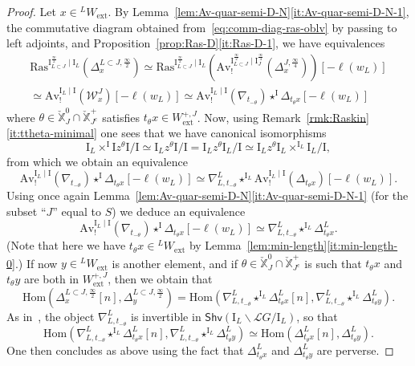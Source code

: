 \documentclass[11pt]{amsart}
\numberwithin{equation}{section}
\theoremstyle{plain}
\theoremstyle{definition}
\newcommand{\I}{{\mathrm I}}
\newcommand{\sL}{{\mathcal L}}
\newcommand{\sW}{{\mathcal W}}
\newcommand{\X}{{\mathbb X}}
\newcommand{\Xd}{\check{\X}}
\newcommand{\Hom}{\mathrm{Hom}}
\newcommand{\semi}{{{\frac{\infty}{2}}}}
\newcommand{\quar}{{{\frac{\infty}{4}}}}
\newcommand{\Av}{\mathrm{Av}}
\newcommand{\ex}{\mathrm{ext}}
\newcommand{\Shv}{\mathsf{Shv}}
\newcommand{\Ras}{\mathrm{Ras}}
\newcommand{\comp}{\mathrm{c}}
\begin{document}
\begin{proof}
Let $x \in {}^L W_\ex$. By Lemma~\ref{lem:Av-quar-semi-D-N}\eqref{it:Av-quar-semi-D-N-1}, the commutative diagram obtained from~\eqref{eq:comm-diag-ras-oblv} by passing to left adjoints, and Proposition~\ref{prop:Ras-D}\eqref{it:Ras-D-1},
we have equivalences 
\begin{multline*}
\Ras^{\I_{L\subset J}^{\semi}\mid \I_L}(\Delta^{L\subset J,\semi}_{x}) \simeq \Ras^{\I_{L\subset J}^{\semi}\mid \I_L}(\Av_!^{\I^\semi_{L \subset J} \mid \I_J^\quar}(\Delta^{J,\quar}_{x}))[-\ell(w_L)] \\
\simeq \Av^{\I_L\mid \I}_! (\sW^{J}_{x})[-\ell(w_L)] \simeq \Av^{\I_L\mid \I}_!(\nabla_{t_{-\theta}}) \star^\I \Delta_{t_\theta x} [-\ell(w_L)] 
\end{multline*}
where $\theta \in \Xd_J^0 \cap \Xd_{J^\comp}^+$ satisfies $t_\theta x \in W_\ex^{+,J}$.
Now, using Remark~\ref{rmk:Raskin}\eqref{it:ttheta-minimal} one sees that we have canonical isomorphisms
\[
\I_L \times^{\I} \I z^\theta \I / \I \simeq \I_L z^\theta \I/\I = \I_L z^\theta \I_L / \I \simeq \I_L z^\theta \I_L \times^{\I_L} \I_L/\I,
\]
from which we obtain an equivalence
\begin{equation}
\label{eqn:computation-standard-perverse}
\Av^{\I_L\mid \I}_!(\nabla_{t_{-\theta}}) \star^\I \Delta_{t_\theta x} [-\ell(w_L)] \simeq \nabla^L_{L,t_{-\theta}} \star^{\I_L} \Av^{\I_L\mid \I}_!(\Delta_{t_\theta x}) [-\ell(w_L)].
\end{equation}
Using once again Lemma~\ref{lem:Av-quar-semi-D-N}\eqref{it:Av-quar-semi-D-N-1} (for the subset ``$J$'' equal to $S$) we deduce an equivalence
\[
\Av^{\I_L\mid \I}_!(\nabla_{t_{-\theta}}) \star^\I \Delta_{t_\theta x} [-\ell(w_L)] \simeq \nabla^L_{L,t_{-\theta}} \star^{\I_L} \Delta^L_{t_\theta x}.
\]
(Note that here we have $t_\theta x \in {}^L W_\ex$ by Lemma~\ref{lem:min-length}\eqref{it:min-length-0}.)
If now $y \in {}^L W_\ex$ is another element, and if $\theta \in \Xd_J^0 \cap \Xd_{J^\comp}^+$ is such that $t_\theta x$ and $t_\theta y$ are both in $W_\ex^{+,J}$, then we obtain that 
\[
\Hom(\Delta^{L \subset J,\semi}_{x}[n],\Delta^{L \subset J,\semi}_{y})=\Hom(\nabla^L_{L,t_{-\theta}} \star^{\I_L} \Delta^L_{t_\theta x}[n],\nabla^L_{L,t_{-\theta}} \star^{\I_L} \Delta^L_{t_\theta y}).
\]
As in~\cite[Lemma~3.1.5(i)]{DL23}, the object $\nabla^L_{L,t_{-\theta}}$ is invertible in $\Shv(\I_L \backslash \sL G / \I_L)$, so that
\[
\Hom(\nabla^L_{L,t_{-\theta}} \star^{\I_L} \Delta^L_{t_\theta x}[n],\nabla^L_{L,t_{-\theta}} \star^{\I_L} \Delta^L_{t_\theta y}) \simeq \Hom(\Delta^L_{t_\theta x}[n],\Delta^L_{t_\theta y}).
\]
One then concludes as above using the fact that $\Delta^L_{t_\theta x}$ and $\Delta^L_{t_\theta y}$ are perverse.


\end{proof}
\end{document}
